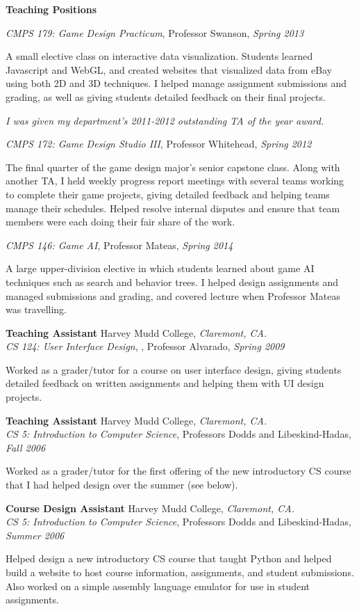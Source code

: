 \documentclass[11pt]{article}
\newenvironment{sct}[1]{%
  \vspace{8pt plus 2pt minus 4pt}\textbf{\Large #1} \hrulefill\vspace{6pt}
  \begin{adjustwidth}{6pt}{0pt}
}{%
  \end{adjustwidth}
}
\newcommand{\indented}[1]{\hspace*{\fill}\parbox{\textwidth-22pt}{#1}}
\newcommand{\teachingexperience}[7]{%
  \textbf{#1} #2, \textit{#3.} \\
  \textit{#4}, #5, \textit{#6} \\
  \indented{#7}
  \vspace{7pt plus 2pt minus 2pt}
}
\begin{document}
\begin{sct}{Teaching Positions}
{\textit{CMPS 179: Game Design Practicum}, Professor Swanson, \textit{Spring 2013} \\
\indented{
A small elective class on interactive data visualization. Students learned
Javascript and WebGL, and created websites that visualized data from eBay using
both 2D and 3D techniques. I helped manage assignment submissions and grading,
as well as giving students detailed feedback on their final projects.
}
\vspace{6pt}

\textit{I was given my department's 2011-2012 outstanding TA of the year award.}
\vspace{6pt}

\textit{CMPS 172: Game Design Studio III}, Professor Whitehead, \textit{Spring 2012} \\
\indented{
The final quarter of the game design major's senior capstone class. Along with
another TA, I held weekly progress report meetings with several teams working
to complete their game projects, giving detailed feedback and helping teams
manage their schedules. Helped resolve internal disputes and ensure that team
members were each doing their fair share of the work.
}
\vspace{6pt}

\textit{CMPS 146: Game AI}, Professor Mateas, \textit{Spring 2014} \\
\indented{
A large upper-division elective in which students learned about game AI
techniques such as search and behavior trees. I helped design assignments and
managed submissions and grading, and covered lecture when Professor Mateas was
travelling.
}
}

\teachingexperience{Teaching Assistant}{Harvey Mudd College}{Claremont, CA}%
{CS 124: User Interface Design}{, Professor Alvarado}{Spring 2009}%
{Worked as a grader/tutor for a course on user interface design, giving students
detailed feedback on written assignments and helping them with UI design
projects.}

\teachingexperience{Teaching Assistant}{Harvey Mudd College}{Claremont, CA}%
{CS 5: Introduction to Computer Science}{Professors Dodds and Libeskind-Hadas}{Fall 2006}%
{Worked as a grader/tutor for the first offering of the new introductory CS
course that I had helped design over the summer (see below).}

\teachingexperience{Course Design Assistant}{Harvey Mudd College}{Claremont, CA}%
{CS 5: Introduction to Computer Science}{Professors Dodds and Libeskind-Hadas}{Summer 2006}%
{Helped design a new introductory CS course that taught Python and helped build
a website to host course information, assignments, and student submissions.
Also worked on a simple assembly language emulator for use in student
assignments.}

\end{sct}
\end{document}
